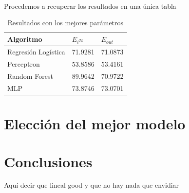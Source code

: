 \documentclass[a4paper,11pt]{article}
\begin{document}
Procedemos a recuperar los resultados en una única tabla

\begin{table}[H]
    \centering
    \begin{tabular}{|l|l|l|}
    \hline
    Algoritmo    & $E_in$  & $E_{out}$ \\ \hline
    Regresión Logística   & 71.9281 & 71.0873 \\ \hline
    Perceptron & 53.8586 & 53.4161 \\ \hline
    Random Forest   & 89.9642 & 70.9722 \\ \hline
    MLP   & 73.8746 & 73.0701 \\ \hline
    \end{tabular}
    \caption{Resultados con los mejores parámetros}
\end{table}

\section{Elección del mejor modelo}


\section{Conclusiones}

Aquí decir que lineal good y que no hay nada que envidiar



\end{document}
